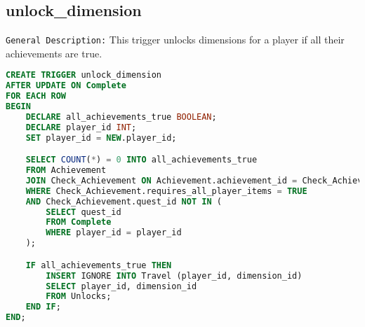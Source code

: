 \documentclass{article}
\begin{document}
\subsection{unlock\_dimension}

\texttt{General Description:} This trigger unlocks dimensions for a player if all their achievements are true.

\begin{lstlisting}[language=SQL]
CREATE TRIGGER unlock_dimension
AFTER UPDATE ON Complete
FOR EACH ROW
BEGIN
    DECLARE all_achievements_true BOOLEAN;
    DECLARE player_id INT;
    SET player_id = NEW.player_id;

    SELECT COUNT(*) = 0 INTO all_achievements_true
    FROM Achievement
    JOIN Check_Achievement ON Achievement.achievement_id = Check_Achievement.achievement_id
    WHERE Check_Achievement.requires_all_player_items = TRUE
    AND Check_Achievement.quest_id NOT IN (
        SELECT quest_id
        FROM Complete
        WHERE player_id = player_id
    );

    IF all_achievements_true THEN
        INSERT IGNORE INTO Travel (player_id, dimension_id)
        SELECT player_id, dimension_id
        FROM Unlocks;
    END IF;
END;
\end{lstlisting}
\end{document}
